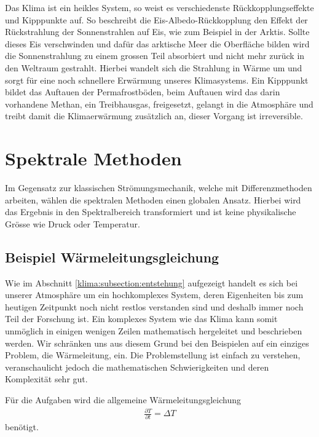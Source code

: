 \begin{refsection}
Das Klima ist ein heikles System, so weist es verschiedenste Rückkopplungseffekte und Kipppunkte auf. So beschreibt die Eis-Albedo-Rückkopplung den Effekt der Rückstrahlung der Sonnenstrahlen auf Eis, wie zum Beispiel in der Arktis. Sollte dieses Eis verschwinden und dafür das arktische Meer die Oberfläche bilden wird die Sonnenstrahlung zu einem grossen Teil absorbiert und nicht mehr zurück in den Weltraum gestrahlt. Hierbei wandelt sich die Strahlung in Wärme um und sorgt für eine noch schnellere Erwärmung unseres Klimasystems. Ein Kipppunkt bildet das Auftauen der Permafrostböden, beim Auftauen wird das darin vorhandene Methan, ein Treibhausgas, freigesetzt, gelangt in die Atmosphäre und treibt damit die Klimaerwärmung zusätzlich an, dieser Vorgang ist irreversible.

\section{Spektrale Methoden
\label{klima:section:spektrale}}
Im Gegensatz zur klassischen Strömungsmechanik, welche mit Differenzmethoden arbeiten, wählen die spektralen Methoden einen globalen Ansatz. Hierbei wird das Ergebnis in den Spektralbereich transformiert und ist keine physikalische Grösse wie Druck oder Temperatur.

\subsection{Beispiel Wärmeleitungsgleichung}
Wie im Abschnitt \ref{klima:subsection:entstehung}  aufgezeigt handelt es sich bei unserer Atmosphäre um ein hochkomplexes System, deren Eigenheiten bis zum heutigen Zeitpunkt noch nicht restlos verstanden sind und deshalb immer noch Teil der Forschung ist. Ein komplexes System wie das Klima kann somit unmöglich in einigen wenigen Zeilen mathematisch hergeleitet und beschrieben werden. Wir schränken uns aus diesem Grund bei den Beispielen auf ein einziges Problem, die Wärmeleitung, ein. Die Problemstellung ist einfach zu verstehen, veranschaulicht jedoch die mathematischen Schwierigkeiten und deren Komplexität sehr gut.

Für die Aufgaben wird die allgemeine Wärmeleitungsgleichung
\begin{align}
\frac{\partial T}{\partial t} = \Delta T
\label{klima:bsp:pdgl}
\end{align}
benötigt.


\end{refsection}

